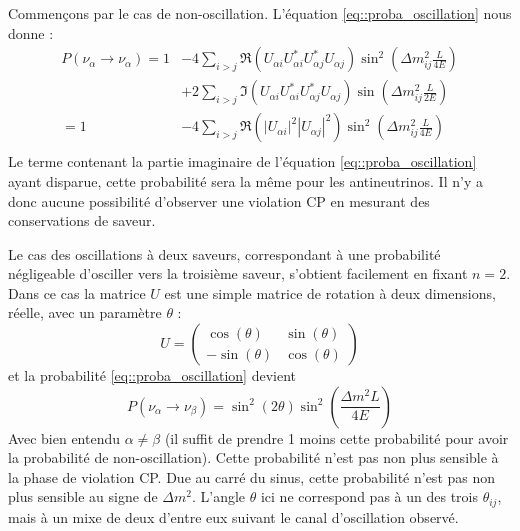             Commençons par le cas de non-oscillation. L'équation \eqref{eq::proba_oscillation} nous donne :
            \begin{equation}\label{eq::proba_non_oscillation}
                \begin{split}
                    P(\nu_{\alpha}\to\nu_{\alpha}) = 1 & - 4\sum_{i>j}\Re(U_{\alpha i}U_{\alpha i}^*U_{\alpha j}^*U_{\alpha j})\sin^2\left(\Delta m_{ij}^2\frac{L}{4E}\right) \\
                    & + 2\sum_{i>j}\Im(U_{\alpha i}U_{\alpha i}^*U_{\alpha j}^*U_{\alpha j})\sin\left(\Delta m_{ij}^2\frac{L}{2E}\right) \\
                    = 1 & -4\sum_{i>j}\Re(|U_{\alpha i}|^2|U_{\alpha j}|^2)\sin^2\left(\Delta m_{ij}^2\frac{L}{4E}\right) \\ 
                \end{split}
            \end{equation}
            Le terme contenant la partie imaginaire de l'équation \eqref{eq::proba_oscillation} ayant disparue, cette probabilité sera la même pour les antineutrinos. Il n'y a donc aucune possibilité d'observer une violation CP en mesurant des conservations de saveur.
            
            Le cas des oscillations à deux saveurs, correspondant à une probabilité négligeable d'osciller vers la troisième saveur, s'obtient facilement en fixant $n=2$. Dans ce cas la matrice $U$ est une simple matrice de rotation à deux dimensions, réelle, avec un paramètre $\theta$ :
            \begin{equation}\label{eq::two_flavor_pmns}
                U = \left(\begin{matrix}
                    \cos(\theta) & \sin(\theta) \\
                    -\sin(\theta) & \cos(\theta)
                \end{matrix}\right)
            \end{equation}
            et la probabilité \eqref{eq::proba_oscillation} devient
            \begin{equation}\label{eq::two_flavors}
                P(\nu_{\alpha}\to\nu_{\beta}) = \sin^2(2\theta)\sin^2\left(\frac{\Delta m^2 L}{4E}\right)
            \end{equation}
            Avec bien entendu $\alpha\ne \beta$ (il suffit de prendre 1 moins cette probabilité pour avoir la probabilité de non-oscillation). Cette probabilité n'est pas non plus sensible à la phase de violation CP. Due au carré du sinus, cette probabilité n'est pas non plus sensible au signe de $\Delta m^2$. L'angle $\theta$ ici ne correspond pas à un des trois $\theta_{ij}$, mais à un mixe de deux d'entre eux suivant le canal d'oscillation observé. 
            
